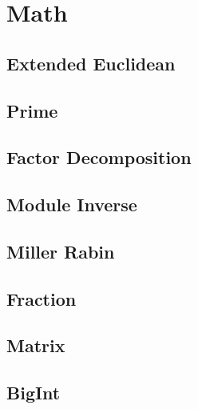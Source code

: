 \documentclass[a4paper,10pt,twocolumn,oneside]{article}
\begin{document}
\section{Math}
\subsection{Extended Euclidean}

\subsection{Prime}

\subsection{Factor Decomposition}

\subsection{Module Inverse}

\subsection{Miller Rabin}

\subsection{Fraction}

\subsection{Matrix}

\subsection{BigInt}

\newpage

\clearpage
\end{document}
